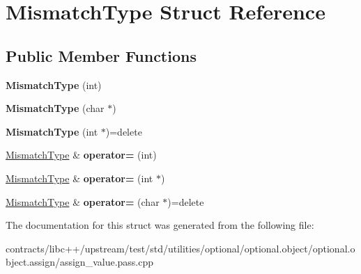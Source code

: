 \hypertarget{struct_mismatch_type}{}\section{Mismatch\+Type Struct Reference}
\label{struct_mismatch_type}
\subsection*{Public Member Functions}
\begin{DoxyCompactItemize}
\item 
\mbox{\label{struct_mismatch_type_a09ae9eda8e5ebfa4786e50616bb8f31b}} 
{\bfseries Mismatch\+Type} (int)
\item 
\mbox{\label{struct_mismatch_type_a048b3bcaa6140b7b0efb6d229b9a1cc6}} 
{\bfseries Mismatch\+Type} (char $\ast$)
\item 
\mbox{\label{struct_mismatch_type_adb8ec0d69fad5aa8320bbd39e38dc471}} 
{\bfseries Mismatch\+Type} (int $\ast$)=delete
\item 
\mbox{\label{struct_mismatch_type_ae15c20fadfbfc7ef4267f3aacb2b560f}} 
\mbox{\hyperlink{struct_mismatch_type}{Mismatch\+Type}} \& {\bfseries operator=} (int)
\item 
\mbox{\label{struct_mismatch_type_a15224b5d877f725336128d6582ebf859}} 
\mbox{\hyperlink{struct_mismatch_type}{Mismatch\+Type}} \& {\bfseries operator=} (int $\ast$)
\item 
\mbox{\label{struct_mismatch_type_a0c63b2206f705436e27b7a7000a8f5e5}} 
\mbox{\hyperlink{struct_mismatch_type}{Mismatch\+Type}} \& {\bfseries operator=} (char $\ast$)=delete
\end{DoxyCompactItemize}


The documentation for this struct was generated from the following file\+:\begin{DoxyCompactItemize}
\item 
contracts/libc++/upstream/test/std/utilities/optional/optional.\+object/optional.\+object.\+assign/assign\+\_\+value.\+pass.\+cpp\end{DoxyCompactItemize}
